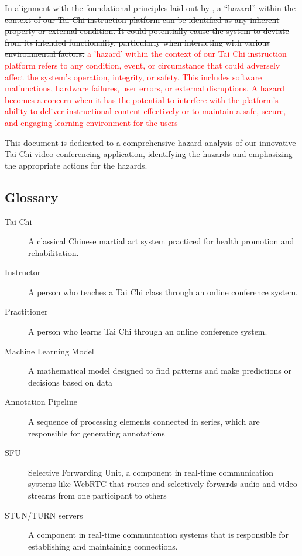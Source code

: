 \documentclass{article}
\begin{document}
In alignment with the foundational principles laid out by
\textcite{leveson_engineering_2011}, \sout{a ``hazard'' within the context of our Tai
Chi instruction platform can be identified as any inherent property or external
condition. It could potentially cause the system to deviate from its intended
functionality, particularly when interacting with various environmental factors.}
\textcolor{red}{a 'hazard' within the context of our Tai Chi instruction platform 
refers to any condition, event, or circumstance that could adversely affect the 
system’s operation, integrity, or safety. This includes software malfunctions, 
hardware failures, user errors, or external disruptions. A hazard becomes a concern 
when it has the potential to interfere with the platform’s ability to deliver 
instructional content effectively or to maintain a safe, secure, and engaging 
learning environment for the users}

This document is dedicated to a comprehensive hazard analysis of our innovative
Tai Chi video conferencing application, identifying the hazards and emphasizing
the appropriate actions for the hazards.

\subsection{Glossary}

\begin{description}
\item[Tai Chi] A classical Chinese martial art system practiced for health
  promotion and rehabilitation.
\item[Instructor] A person who teaches a Tai Chi class through an online conference
  system.
\item[Practitioner] A person who learns Tai Chi through an online conference
  system.
\item[Machine Learning Model] A mathematical model designed to find patterns and make predictions or decisions based on data
\item[Annotation Pipeline] A sequence of processing elements connected in series, which are responsible for generating annotations
\item[SFU] Selective Forwarding Unit, a component in real-time communication systems like WebRTC that routes and selectively forwards audio and video streams from one participant to others
\item[STUN/TURN servers] A component in real-time communication systems that is responsible for establishing and maintaining connections.
\end{description}
\end{document}
